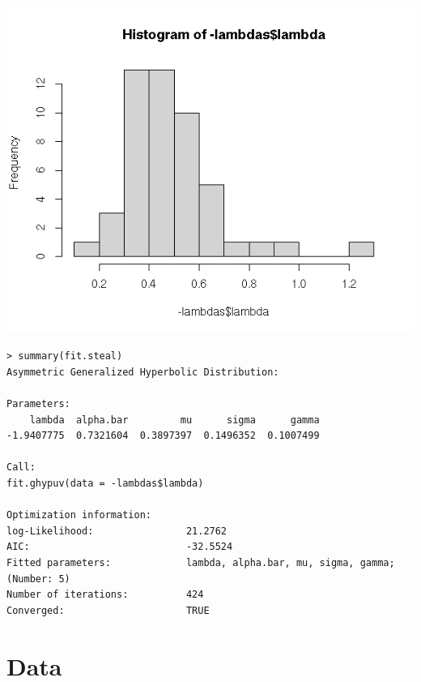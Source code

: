 \documentclass{amsart}
\begin{document}
\includegraphics[scale=1.0]{stld.png}

\begin{verbatim}
> summary(fit.steal)
Asymmetric Generalized Hyperbolic Distribution:

Parameters:
    lambda  alpha.bar         mu      sigma      gamma 
-1.9407775  0.7321604  0.3897397  0.1496352  0.1007499 

Call:
fit.ghypuv(data = -lambdas$lambda)

Optimization information:
log-Likelihood:                21.2762 
AIC:                           -32.5524 
Fitted parameters:             lambda, alpha.bar, mu, sigma, gamma;  (Number: 5)
Number of iterations:          424 
Converged:                     TRUE 
\end{verbatim}

\section{Data}
\end{document}
